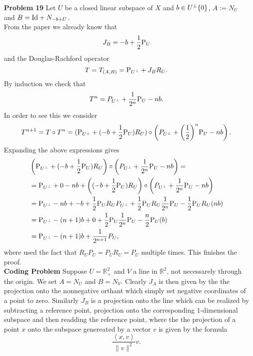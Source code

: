 \documentclass{scrartcl}
\newcommand{\R}{\mathbb{R}}
\theoremstyle{plain}
\theoremstyle{remark}
\newcommand{\Id}{\textup{Id}}
\renewcommand{\P}{\textup{P}}
\begin{document}
\textbf{Problem 19} Let $U$ be a closed linear subspace of $X$ and $b \in U^{\perp}\\ \{0\}$, $A:= N_U$ and $B=\Id + N_{-b+U}$. \\
From the paper we already know that
\begin{equation}
  J_B = -b +\frac{1}{2}\P_U
\end{equation}
and the Douglas-Rachford operator
\begin{equation}
  T = T_{(A,B)} = \P_{U^{\perp}} + J_B R_U.
\end{equation}
By induction we check that
\begin{equation}
  T^n = P_{U^{\perp}} + \frac{1}{2^n} \P_U - n b.
\end{equation}
In order to see this we consider
\begin{equation}
  T^{n+1} = T \circ T^{n} = (\P_{U^{\perp}} + (-b +\frac{1}{2}\P_U) R_U)\circ\left(P_{U^{\perp}} + {\left(\frac{1}{2}\right)}^{n} \P_U - n b\right).
\end{equation}
Expanding the above expressions gives
\begin{equation}
  \begin{aligned}
    &\left(\P_{U^{\perp}} + (-b +\frac{1}{2}\P_U) R_U\right)\circ\left(P_{U^{\perp}} + \frac{1}{2^n} \P_U - n b\right) = \\
    &= \P_{U^{\perp}} + 0 - nb + \left((-b +\frac{1}{2}\P_U) R_U\right) \circ \left(P_{U^{\perp}} + \frac{1}{2^n} \P_U - n b\right)\\
    &= \P_{U^{\perp}} - nb + - b + \frac{1}{2}\P_U R_U P_{U^{\perp}} + \frac{1}{2}\P_U R_U \frac{1}{2^n} \P_U  - \frac{1}{2}\P_U R_U(n b) \\
    &= \P_{U^{\perp}} - (n+1)b + 0 + \frac{1}{2}\P_U \frac{1}{2^n} \P_U - \frac{n}{2}\P_U ( b) \\
    &= \P_{U^{\perp}} - (n+1)b  + \frac{1}{2^{n+1}} P_U,
  \end{aligned}
\end{equation}
where used the fact that $R_U P_U = P_U R_U = P_U$ multiple times.
This finishes the proof.\\


\textbf{Coding Problem} Suppose $U = \R^2_+$ and $V$ a line in $\R^2$, not necessarely through the origin.
We set $A= N_U$ and $B=N_V$.
Clearly $J_A$ is then given by the the projection onto the nonnegative orthant which simply set negative coordinates of a point to zero.
Similarly $J_B$ is a projection onto the line which can be realized by subtracting a reference point, projection onto the corresponding $1$-dimensional subspace and then readding the reference point, where the the projection of a point $x$ onto the subspace genereated by a vector $v$ is given by the formula
\begin{equation}
  \frac{\left\langle x,v \right\rangle }{\lVert v \rVert^2} v.
\end{equation}
\end{document}
